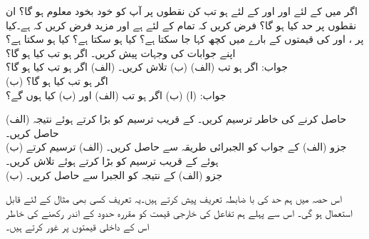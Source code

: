اگر  میں  کے لئے  اور  اور  کے لئے  ہو تب کن نقطوں  پر آپ کو  خود بخود معلوم ہو گا؟ ان نقطوں پر حد کیا ہو گا؟
فرض کریں کہ تمام  کے لئے  ہے اور مزید فرض کریں کہ  ہے۔کیا  پر ،  اور  کی قیمتوں کے بارے میں کچھ کہا جا سکتا ہے؟ کیا  ہو سکتا ہے؟ کیا  ہو سکتا ہے؟ اپنے جوابات کی وجہات پیش کریں۔
اگر  ہو تب  کیا ہو گا؟\\
جواب: 
اگر  ہو تب (الف)  (ب)  تلاش کریں۔
(الف) \quad
اگر  ہو تب  کیا ہو گا؟\\
(ب) \quad
اگر  ہو تب  کیا ہو گا؟\\
جواب: (ا)  (ب) 
اگر  ہو تب (الف)  اور (ب)  کیا ہوں گے؟


(الف)\quad
{} حاصل کرنے کی خاطر  ترسیم کریں۔  کے قریب ترسیم کو بڑا کرتے ہوئے نتیجہ حاصل کریں۔\\
(ب)\quad
جزو (الف) کے جواب کو الجبرائی طریقہ سے حاصل کریں۔ 
(الف)\quad
{} ترسیم کرتے ہوئے  کے قریب ترسیم کو بڑا کرتے ہوئے  تلاش کریں۔ \\
(ب)\quad
جزو (الف) کے نتیجہ کو الجبرا سے حاصل کریں۔

اس حصہ میں ہم حد کی با ضابطہ تعریف پیش کرتے ہیں۔یہ تعریف کسی بھی مثال کے لئے قابل استعمال ہو گی۔ اس سے پہلے ہم تفاعل کی خارجی قیمت کو مقررہ حدود کے اندر رکھنے کی خاطر اس کے داخلی قیمتوں پر غور کرتے ہیں۔

